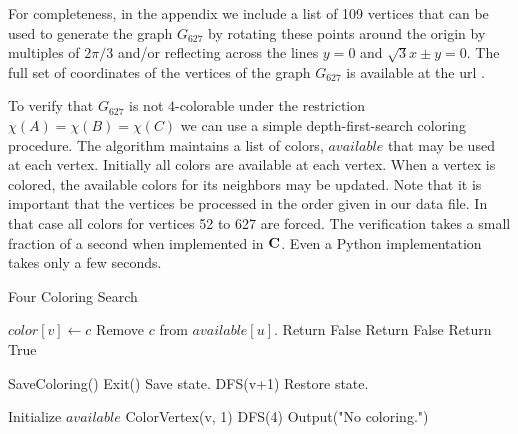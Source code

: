\documentclass [11pt,oneside]{amsart}
\theoremstyle{definition}
\theoremstyle{plain}
\begin{document}
\vspace{4mm}

For completeness, in the appendix we include a list of 109 vertices that can be used to generate the graph $G_{627}$ by rotating
these points around the origin by multiples of $2\pi/3$ and/or reflecting across the lines $y=0$ and $\sqrt{3}x\pm y =0$.
The full set of coordinates of the vertices of the graph $G_{627}$ is available at the url \cite{website}.

To verify that $G_{627}$ is not $4$-colorable under the restriction $\chi(A)=\chi(B)=\chi(C)$  we can use a simple
depth-first-search
coloring procedure.
The algorithm maintains a list of colors, $available$
that may be used at each vertex.  Initially all colors are available at each
vertex.  When a vertex is colored, the available colors for its neighbors may be
updated.
Note that it is important that the vertices be processed in the order given in our data file.
In that case all colors for vertices 52 to 627 are forced.
The verification takes a small fraction of a second when implemented in ${\bf C}$.  Even a Python
implementation takes only a few seconds.

\vspace{5mm}

\begin{algorithm}[htb!]
\caption{Four Coloring Search}\label{algo:fourcolor}
\begin{algorithmic}[1]
   \State $color[v] \gets c$
      \State Remove $c$ from $available[u]$.
         \State Return False
            \State Return False
         \EndIf
      \EndIf
   \EndFor
   \State Return True
\EndProcedure

\Statex

      \State SaveColoring()
      \State Exit()
   \EndIf
       \State Save state.
          \State DFS(v+1)
       \EndIf
       \State Restore state.
   \EndFor
\EndProcedure

\Statex

   \State Initialize $available$
      \State ColorVertex(v, 1)
   \EndFor
   \State DFS(4)
   \State Output("No coloring.")
\EndProcedure
\end{algorithmic}
\end{algorithm}
\end{document}
